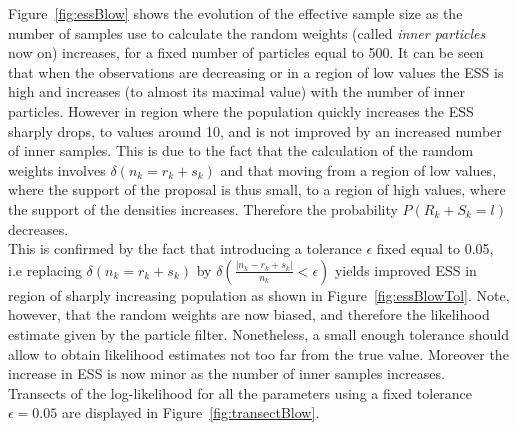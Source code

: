 \documentclass[12pt]{article}
\begin{document}
	Figure~\ref{fig:essBlow} shows the evolution of the effective sample size as the number of samples use to calculate the random weights (called \emph{inner particles} now on) increases, for a fixed number of particles equal to 500. It can be seen that when the observations are decreasing or in a region of low values the ESS is high and increases (to almost its maximal value) with the number of inner particles. However in region where the population quickly increases the ESS sharply drops, to values around 10, and is not improved by an increased number of inner samples. This is due to the fact that the calculation of the ramdom weights involves $\delta(n_k = r_k+s_k)$ and that moving from a region of low values, where the support of the proposal is thus small, to a region of high values, where the support of the densities increases. Therefore the probability $P(R_k+S_k=l)$ decreases. \\
	This is confirmed by the fact that introducing a tolerance $\epsilon$ fixed equal to 0.05, i.e replacing $\delta(n_k = r_k+s_k)$ by $\delta(\frac{|n_k - r_k+s_k|}{n_k} < \epsilon)$ yields improved ESS in region of sharply increasing population as shown in Figure~\ref{fig:essBlowTol}. Note, however, that the random weights are now biased, and therefore the likelihood estimate given by the particle filter. Nonetheless, a small enough tolerance should allow to obtain likelihood estimates not too far from the true value. Moreover the increase in ESS is now minor as the number of inner samples increases. \\
	
	Transects of the log-likelihood for all the parameters using a fixed tolerance $\epsilon=0.05$ are displayed in Figure~\ref{fig:transectBlow}.
	
\end{document}
